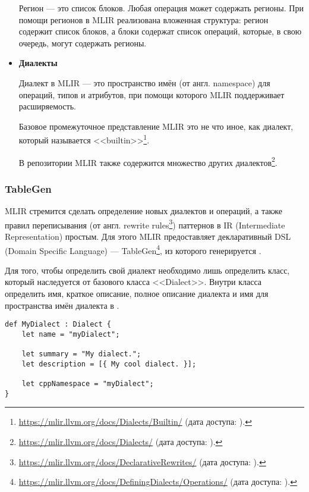 \begin{itemize}
	      Регион --- это список блоков. Любая операция может содержать регионы. При помощи регионов в MLIR реализована вложенная структура: регион содержит список блоков, а блоки содержат список операций, которые, в свою очередь, могут содержать регионы.

	\item
	      \textbf{Диалекты}

	      Диалект в MLIR --- это пространство имён (от англ. namespace) для операций, типов и атрибутов, при помощи которого MLIR поддерживает расширяемость.

	      Базовое промежуточное представление MLIR это не что иное, как диалект, который называется <<builtin>>\footnote{\url{https://mlir.llvm.org/docs/Dialects/Builtin/} (дата доступа:   ).}.

	      В репозитории MLIR также содержится множество других диалектов\footnote{\url{https://mlir.llvm.org/docs/Dialects/} (дата доступа:   ).}.
\end{itemize}

\subsubsection{TableGen}

MLIR стремится сделать определение новых диалектов и операций, а также правил переписывания (от англ. rewrite rules\footnote{\url{https://mlir.llvm.org/docs/DeclarativeRewrites/} (дата доступа:   ).}) паттернов в IR (Intermediate Representation) простым. Для этого MLIR предоставляет декларативный DSL (Domain Specific Language) --- TableGen\footnote{\url{https://mlir.llvm.org/docs/DefiningDialects/Operations/} (дата доступа:   ).}, из которого генерируется \Cpp{}.

Для того, чтобы определить свой диалект необходимо лишь определить класс, который наследуется от базового класса <<Dialect>>. Внутри класса определить имя, краткое описание, полное описание диалекта и имя для пространства имён диалекта в \Cpp{}.

\begin{lstlisting}[caption={Пример определения диалекта <<MyDialect>>, при помощи TableGen.}, frame=single]
def MyDialect : Dialect {
    let name = "myDialect";

    let summary = "My dialect.";
    let description = [{ My cool dialect. }];

    let cppNamespace = "myDialect";
}
\end{lstlisting}

